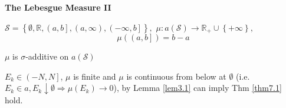 \setcounter{lecture}{7}
\begin{center}
	\Large \bf The Lebesgue Measure II
\end{center}
\vspace{0.25cm}

$ \mathcal{S} = \left\{ {\emptyset ,\mathbb{R},\left( {a,b} \right],\left( {a,\infty } \right),\left( { - \infty ,b} \right]} \right\}, $  $\mu :a\left( \mathcal{S} \right) \to {\mathbb{R}_ + } \cup \left\{ { + \infty } \right\}, $
\begin{equation}
\mu \left( {\left( {a,b} \right]} \right) = b - a
\end{equation}
 
  


\begin{theorem}
    $\mu $ is $ \sigma $-additive on $ a(\mathcal{S}) $
	\label{thm7.1}
\end{theorem}

\begin{remark}
	${E_k} \in \left( { - N,N} \right]$, $ \mu $ is finite and $ \mu  $ is continuous from below at $ \emptyset $ (i.e. $ {E_k} \in a,{E_k} \downarrow \emptyset  \Rightarrow \mu \left( {{E_k}} \right) \to 0 $), by Lemma \ref{lem3.1} can imply Thm \ref{thm7.1} hold. 
	\label{rmk7.1}
\end{remark}

